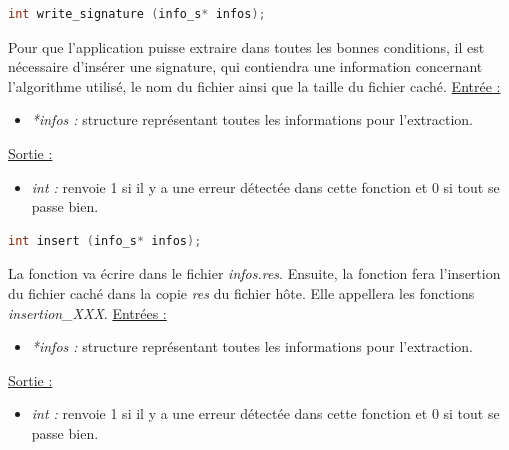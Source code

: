 \documentclass[11pt]{article}
\begin{document}
\begin{lstlisting}[language=c]
int write_signature (info_s* infos); 
\end{lstlisting}

Pour que l'application puisse extraire dans toutes les bonnes conditions, 
il est nécessaire d'insérer une signature, qui contiendra une information
concernant l'algorithme utilisé, le nom du fichier ainsi que la taille du 
fichier caché. 
\newline
\underline{Entrée :} 
\begin{itemize}
\item \textit{*infos :} structure représentant toutes les informations pour 
l'extraction. 
\end{itemize}
\underline{Sortie :} 
\begin{itemize}
\item \textit{int :} renvoie 1 si il y a une erreur détectée dans cette 
fonction et 0 si tout se passe bien.  
\newline 
\end{itemize}



\begin{lstlisting}[language=c]
int insert (info_s* infos); 
\end{lstlisting}

La fonction va écrire dans le fichier \textit{infos.res}. 
Ensuite, la fonction fera l'insertion du fichier caché dans la copie 
\textit{res} du fichier hôte. 
Elle appellera les fonctions \textit{insertion\_XXX}. 
\newline
\underline{Entrées :} 
\begin{itemize}
\item \textit{*infos :} structure représentant toutes les informations pour 
l'extraction. 
\end{itemize}
\underline{Sortie :} 
\begin{itemize}
\item \textit{int :} renvoie 1 si il y a une erreur détectée dans cette 
fonction et 0 si tout se passe bien.  
\newline 
\end{itemize}
\end{document}
